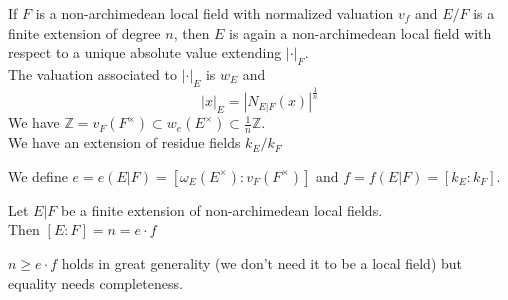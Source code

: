 \documentclass[../main.tex]{subfiles}
\begin{document}
If $F$ is a non-archimedean local field with normalized valuation $v_f$ and $ E /F$ is a finite extension of degree $n$, then $E$ is again a non-archimedean local field with respect to a unique absolute value extending $|\cdot|_F$.\\
The valuation associated to $|\cdot|_E$ is $w_E$ and
\[ 
|x|_E = |N_{E |F} ( x) |^{\frac{1}{n}}
\]
We have $ \mathbb{Z}= v_F( F^{\times}) \subset w_e( E^{\times}) \subset \frac{1}{n} \mathbb{Z} $.\\
We have an extension of residue fields $k_E /k_F$ 
\begin{defn}
	We define $e= e( E|F) = [ \omega_E( E^{\times}) : v_F( F^{\times}) ] $ and $f= f( E|F) = [ k_E : k_F] $.
\end{defn}
\begin{propo}
Let $E|F$ be a finite extension of non-archimedean local fields.\\
Then $ [ E:F] = n = e\cdot f$ 
\end{propo}
\begin{rmq}
$n \geq e \cdot f$ holds in great generality (we don't need it to be a local field) but equality needs completeness.
\end{rmq}
\end{document}
